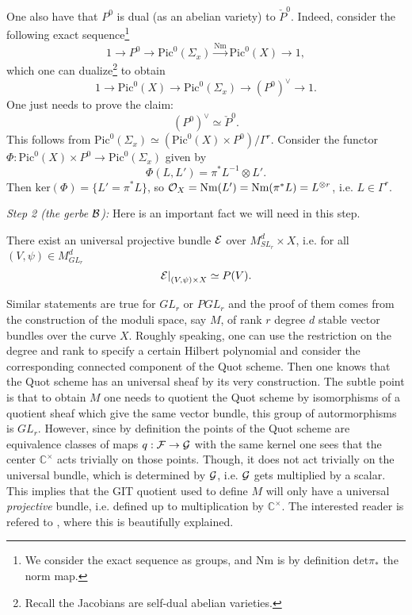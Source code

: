 One also have that $P^0$ is dual (as an abelian variety) to
$\check{P}^0$. Indeed, consider the following exact sequence\footnote{We
  consider the exact sequence as groups, and $\mbox{Nm}$ is by
  definition $\mbox{det}\pi_*$ the norm map.}
\[1 \rightarrow P^0 \rightarrow \mbox{Pic}^0(\Sigma_x) \overset{\mbox{Nm}}{\rightarrow}
\mbox{Pic}^0(X) \rightarrow 1,\]
which one can dualize\footnote{Recall the Jacobians are self-dual
  abelian varieties.} to obtain
\[1 \rightarrow \mbox{Pic}^0(X) \rightarrow \mbox{Pic}^0(\Sigma_x) \rightarrow
\left(P^0\right)^{\vee} \rightarrow 1.\]
One just needs to prove the claim:
\[\left(P^0\right)^{\vee} \simeq \check{P}^0.\]
This follows from $\mbox{Pic}^0(\Sigma_x)\simeq
\left(\mbox{Pic}^0(X)\times P^0\right)/\Gamma^r$. Consider the functor
$\Phi: \mbox{Pic}^0(X)\times P^0 \rightarrow \mbox{Pic}^0(\Sigma_x)$ given by
\[\Phi(L,L') = \pi^*L^{-1}\otimes L'.\]
Then $\mbox{ker}(\Phi) = \{L' = \pi^*L\}$, so $\mathcal{O}_X = \mbox{Nm}(L') =
\mbox{Nm}(\pi^*L)=L^{\otimes r}$, i.e. $L \in \Gamma^r$.

\textit{Step 2 (the gerbe $\mathcal{B}$):}
Here is an important fact we will need in this step.
\begin{prop}
There exist an universal projective bundle $\mathcal{E}$ over
$M^d_{SL_r}\times X$, i.e. for all $(V,\psi) \in M^d_{GL_r}$
\[\left.\mathcal{E}\right|_{(V,\psi)\times X}\simeq P(V).\]
\end{prop}

\begin{rem*}
Similar statements are true for $GL_r$ or $PGL_r$ and the proof of
them comes from the construction of the moduli space, say $M$, of rank $r$
degree $d$ stable vector bundles over the curve $X$. Roughly speaking,
one can use the restriction on the
degree and rank to specify a certain Hilbert polynomial and consider
the corresponding connected component of the Quot scheme. Then one
knows that the Quot scheme has an universal sheaf by its very
construction. The subtle point is that to obtain $M$ one needs to
quotient the Quot scheme by isomorphisms of a quotient sheaf which give the
same vector bundle, this group of autormorphisms is $GL_r$. However, since by definition the
points of the Quot scheme are equivalence classes of maps $q: \mathcal{F} \rightarrow
\mathcal{G}$ with the same kernel one sees that the center $\mathbb{C}^{\times}$ acts
trivially on those points. Though, it does not act trivially on the
universal bundle, which is determined by $\mathcal{G}$, i.e. $\mathcal{G}$ gets
multiplied by a scalar. This implies that the GIT quotient used to
define $M$ will only have a universal \emph{projective} bundle,
i.e. defined up to multiplication by $\mathbb{C}^{\times}$. The interested
reader is refered to \cite[Chapter5]{Ne}, where this is beautifully
explained.
\end{rem*}

